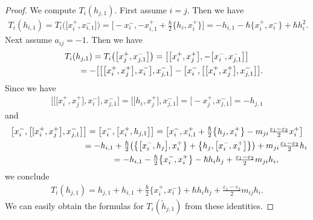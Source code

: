 \documentclass[11pt]{article}
\theoremstyle{definition}
\numberwithin{equation}{section}
\newcommand{\ve}{\varepsilon}
\begin{document}
\begin{proof}
We compute $T_{i}(h_{j,1})$. First assume $i=j$. Then we have
\begin{gather*}
T_i(h_{i,1}) = T_i\big(\big[x_{i}^+,x_{i,1}^-\big]\big) = \big[{-}x_{i}^-, -x_{i,1}^+ + \tfrac{\hbar}{2}\big\{ h_i, x_i^+ \big\}\big] = -h_{i,1} - \hbar \big\{x_i^+,x_i^-\big\} + \hbar h_i^2.
\end{gather*}
Next assume $a_{ij}=-1$. Then we have
\begin{gather*}
T_i(h_{j,1}) = T_i\big(\big[x_{j}^+,x_{j,1}^-\big]\big) = \big[\big[x_i^+,x_{j}^+\big], -\big[x_i^-,x_{j,1}^-\big]\big] \\
\hphantom{T_i(h_{j,1})}{} = - \big[\big[\big[x_i^+,x_j^+\big],x_i^-\big],x_{j,1}^-\big]-\big[x_i^-,\big[\big[x_i^+,x_j^+\big],x_{j,1}^-\big]\big].
\end{gather*}
Since we have
\begin{gather*}
\big[\big[\big[x_i^+,x_j^+\big],x_i^-\big],x_{j,1}^-\big]=\big[\big[h_i,x_j^+\big],x_{j,1}^-\big]=\big[{-}x_j^+,x_{j,1}^-\big]=-h_{j,1}
\end{gather*}
and
\begin{gather*}
\big[x_i^-,\big[[x_i^+,x_j^+\big],x_{j,1}^-\big]\big] =\big[x_i^-,\big[x_i^+,h_{j,1}\big]\big] = \big[x_i^-,x_{i,1}^++\tfrac{\hbar}{2}\big\{h_j,x_i^+\big\}-m_{ji}\tfrac{\ve_1 - \ve_2}{2} x_i^+\big] \\
\hphantom{\big[x_i^-,\big[[x_i^+,x_j^+\big],x_{j,1}^-\big]\big]}{} = -h_{i,1} + \tfrac{\hbar}{2}\big( \big\{\big[x_i^-,h_j\big],x_i^+\big\} + \big\{ h_j, \big[x_i^-, x_i^+\big] \big\}\big) + m_{ji}\tfrac{\ve_1 - \ve_2}{2} h_i \\
\hphantom{\big[x_i^-,\big[[x_i^+,x_j^+\big],x_{j,1}^-\big]\big]}{} = -h_{i,1} - \tfrac{\hbar}{2} \big\{x_i^-,x_i^+\big\} - \hbar h_i h_j + \tfrac{\ve_1 - \ve_2}{2}m_{ji} h_i,
\end{gather*}
we conclude
\begin{gather*}
T_i(h_{j,1})=h_{j,1}+h_{i,1}+\tfrac{\hbar}{2} \big\{x_i^+,x_i^-\big\} + \hbar h_i h_j + \tfrac{\ve_1 - \ve_2}{2}m_{ij} h_i.
\end{gather*}
We can easily obtain the formulas for $T_{i}(\tilde{h}_{j,1})$ from these identities.
\end{proof}
\end{document}
